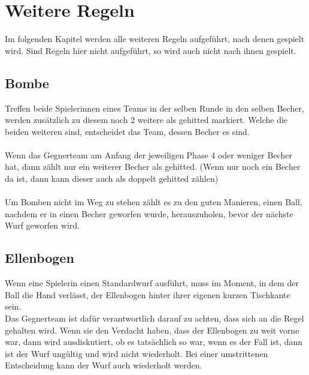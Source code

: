 \documentclass[a5paper, 12pt]{book}
\begin{document}
\chapter{Weitere Regeln}\label{weitereregeln}
Im folgenden Kapitel werden alle weiteren Regeln aufgeführt, nach denen gespielt wird. Sind Regeln hier nicht aufgeführt, so wird auch nicht nach ihnen gespielt.
\section{Bombe}\label{bombe}
Treffen beide Spielerinnen eines Teams in der selben Runde in den selben Becher, werden zusätzlich zu diesem noch 2 weitere als gehitted markiert. Welche die beiden weiteren sind, entscheidet das Team, dessen Becher es sind. \\\\
Wenn das Gegnerteam am Anfang der jeweiligen Phase 4 oder weniger Becher hat, dann zählt nur ein weiterer Becher als gehitted. (Wenn nur noch ein Becher da ist, dann kann dieser auch als doppelt gehitted zählen)\\\\
Um Bomben nicht im Weg zu stehen zählt es zu den guten Manieren, einen Ball, nachdem er in einen Becher geworfen wurde, herauszuholen, bevor der nächste Wurf geworfen wird.
\section{Ellenbogen}\label{ellenbogen}
Wenn eine Spielerin einen Standardwurf ausführt, muss im Moment, in dem der Ball die Hand verlässt, der Ellenbogen hinter ihrer eigenen kurzen Tischkante sein.\\
Das Gegnerteam ist dafür verantwortlich darauf zu achten, dass sich an die Regel gehalten wird. Wenn sie den Verdacht haben, dass der Ellenbogen zu weit vorne war, dann wird ausdiskutiert, ob es tatsächlich so war, wenn es der Fall ist, dann ist der Wurf ungültig und wird nicht wiederholt. Bei einer umstrittenen Entscheidung kann der Wurf auch wiederholt werden.
\end{document}

